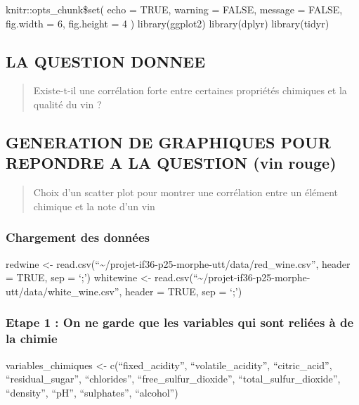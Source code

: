 \documentclass[
]{article}
\author{}
\date{\vspace{-2.5em}}
\begin{document}
knitr::opts\_chunk\$set( echo = TRUE, warning = FALSE, message = FALSE,
fig.width = 6, fig.height = 4 ) library(ggplot2) library(dplyr)
library(tidyr)

\subsection{\texorpdfstring{\textbf{LA QUESTION
DONNEE}}{LA QUESTION DONNEE}}\label{la-question-donnee}

\begin{quote}
Existe-t-il une corrélation forte entre certaines propriétés chimiques
et la qualité du vin ?
\end{quote}

\subsection{\texorpdfstring{\textbf{GENERATION DE GRAPHIQUES POUR
REPONDRE A LA QUESTION (vin
rouge)}}{GENERATION DE GRAPHIQUES POUR REPONDRE A LA QUESTION (vin rouge)}}\label{generation-de-graphiques-pour-repondre-a-la-question-vin-rouge}

\begin{quote}
Choix d'un scatter plot pour montrer une corrélation entre un élément
chimique et la note d'un vin
\end{quote}

\subsubsection{Chargement des données}\label{chargement-des-donnuxe9es}

redwine \textless-
read.csv(``\textasciitilde/projet-if36-p25-morphe-utt/data/red\_wine.csv'',
header = TRUE, sep = `;') whitewine \textless-
read.csv(``\textasciitilde/projet-if36-p25-morphe-utt/data/white\_wine.csv'',
header = TRUE, sep = `;')

\subsubsection{Etape 1 : On ne garde que les variables qui sont reliées
à de la
chimie}\label{etape-1-on-ne-garde-que-les-variables-qui-sont-reliuxe9es-uxe0-de-la-chimie}

variables\_chimiques \textless- c(``fixed\_acidity'',
``volatile\_acidity'', ``citric\_acid'', ``residual\_sugar'',
``chlorides'', ``free\_sulfur\_dioxide'', ``total\_sulfur\_dioxide'',
``density'', ``pH'', ``sulphates'', ``alcohol'')
\end{document}
